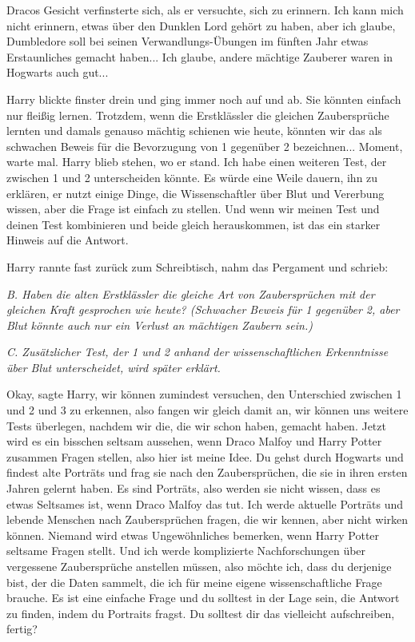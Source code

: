 Dracos Gesicht verfinsterte sich, als er versuchte, sich zu erinnern. \glqq Ich
kann mich nicht erinnern, etwas über den Dunklen Lord gehört zu haben, aber ich
glaube, Dumbledore soll bei seinen Verwandlungs-Übungen im fünften Jahr etwas
Erstaunliches gemacht haben... Ich glaube, andere mächtige Zauberer waren in
Hogwarts auch gut...\grqq{}

Harry blickte finster drein und ging immer noch auf und ab. \glqq Sie könnten
einfach nur fleißig lernen. Trotzdem, wenn die Erstklässler die gleichen
Zaubersprüche lernten und damals genauso mächtig schienen wie heute, könnten wir
das als schwachen Beweis für die Bevorzugung von 1 gegenüber 2 bezeichnen...
Moment, warte mal.\grqq{} Harry blieb stehen, wo er stand. \glqq Ich habe einen
weiteren Test, der zwischen 1 und 2 unterscheiden könnte. Es würde eine Weile
dauern, ihn zu erklären, er nutzt einige Dinge, die Wissenschaftler über Blut
und Vererbung wissen, aber die Frage ist einfach zu stellen. Und wenn wir meinen
Test und deinen Test kombinieren und beide gleich herauskommen, ist das ein
starker Hinweis auf die Antwort.\grqq{}

Harry rannte fast zurück zum Schreibtisch, nahm das Pergament und schrieb:

\emph{B. Haben die alten Erstklässler die gleiche Art von Zaubersprüchen mit der
gleichen Kraft gesprochen wie heute? (Schwacher Beweis für 1 gegenüber 2, aber
Blut könnte auch nur ein Verlust an mächtigen Zaubern sein.) }

\emph{C. Zusätzlicher Test, der 1 und 2 anhand der wissenschaftlichen
Erkenntnisse über Blut unterscheidet, wird später erklärt. }

\glqq Okay\grqq{}, sagte Harry, \glqq wir können zumindest versuchen, den
Unterschied zwischen 1 und 2 und 3 zu erkennen, also fangen wir gleich damit an,
wir können uns weitere Tests überlegen, nachdem wir die, die wir schon haben,
gemacht haben. Jetzt wird es ein bisschen seltsam aussehen, wenn Draco Malfoy
und Harry Potter zusammen Fragen stellen, also hier ist meine Idee. Du gehst
durch Hogwarts und findest alte Porträts und frag sie nach den Zaubersprüchen,
die sie in ihren ersten Jahren gelernt haben. Es sind Porträts, also werden sie
nicht wissen, dass es etwas Seltsames ist, wenn Draco Malfoy das tut. Ich werde
aktuelle Porträts und lebende Menschen nach Zaubersprüchen fragen, die wir
kennen, aber nicht wirken können. Niemand wird etwas Ungewöhnliches bemerken,
wenn Harry Potter seltsame Fragen stellt. Und ich werde komplizierte
Nachforschungen über vergessene Zaubersprüche anstellen müssen, also möchte ich,
dass du derjenige bist, der die Daten sammelt, die ich für meine eigene
wissenschaftliche Frage brauche. Es ist eine einfache Frage und du solltest in
der Lage sein, die Antwort zu finden, indem du Portraits fragst. Du solltest dir
das vielleicht aufschreiben, fertig?\grqq{}


